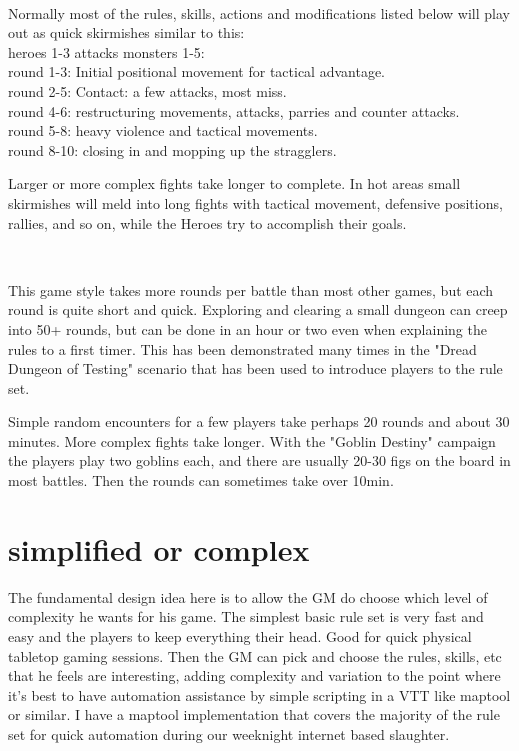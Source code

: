 \

Normally most of the rules, skills, actions and modifications listed below will play out as quick skirmishes similar to this: \\
heroes 1-3 attacks monsters 1-5: \\
round 1-3: Initial positional movement for tactical advantage. \\
round 2-5: Contact: a few attacks, most miss. \\
round 4-6: restructuring movements, attacks, parries and counter attacks. \\
round 5-8: heavy violence and tactical movements. \\
round 8-10: closing in and mopping up the stragglers.

Larger or more complex fights take longer to complete. In hot areas small skirmishes will meld into long fights with tactical movement, defensive positions, rallies, and so on, while the Heroes try to accomplish their goals.

\

This game style takes more rounds per battle than most other games, but each round is quite short and quick. Exploring and clearing a small dungeon can creep into 50+ rounds, but can be done in an hour or two even when explaining the rules to a first timer. This has been demonstrated many times in the "Dread Dungeon of Testing" scenario that has been used to introduce players to the rule set.

Simple random encounters for a few players take perhaps 20 rounds and about 30 minutes. More complex fights take longer. With the "Goblin Destiny" campaign the players play two goblins each, and there are usually 20-30 figs on the board in most battles. Then the rounds can sometimes take over 10min.


\section*{simplified or complex}
The fundamental design idea here is to allow the GM do choose which level of complexity he wants for his game. The simplest basic rule set is very fast and easy and the players to keep everything their head. Good for quick physical tabletop gaming sessions. Then the GM can pick and choose the rules, skills, etc that he feels are interesting, adding complexity and variation to the point where it's best to have automation assistance by simple scripting in a VTT like maptool or similar. I have a maptool implementation that covers the majority of the rule set for quick automation during our weeknight internet based slaughter.


